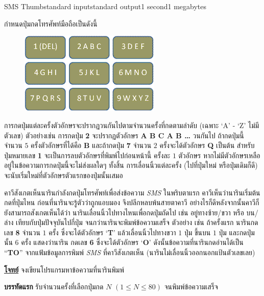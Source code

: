 \documentclass[11pt,a4paper]{article}
\begin{document}
\begin{problem}{SMS Thumb}{standard input}{standard output}{1 second}{1 megabytes}

กำหนดปุ่มกดโทรศัพท์มือถือเป็นดังนี้

\begin{figure}[h!]
\centering
\includegraphics[width=0.6\textwidth]{../latex/img/1059/1059-1.png}
\end{figure}

การกดปุ่มแต่ละครั้งตัวอักษรจะปรากฏวนกันไปตามจำนวนครั้งที่กดตามลำดับ (เฉพาะ ‘A’ - ‘Z’ ไม่มีตัวเลข) ตัวอย่างเช่น การกดปุ่ม \textbf{2} จะปรากฏตัวอักษร \textbf{A B C A B …} วนกันไป ถ้ากดปุ่มนี้จำนวน $5$ ครั้งตัวอักษรที่ได้คือ \textbf{B} และถ้ากดปุ่ม \textbf{7} จำนวน $2$ ครั้งจะได้ตัวอักษร \textbf{Q} เป็นต้น สำหรับปุ่มหมายเลข \textbf{1} จะเป็นการลบตัวอักษรที่พิมพ์ไปก่อนหน้านี้ ครั้งละ $1$ ตัวอักษร หากไม่มีตัวอักษรเหลืออยู่ในข้อความการกดปุ่มนี้จะไม่ส่งผลใดๆ ทั้งสิ้น การเลื่อนนิ้วแต่ละครั้ง (ไปที่ปุ่มใหม่ หรือปุ่มเดิมก็ดี) จะนับเริ่มใหม่ที่ตัวอักษรตัวแรกของปุ่มนั้นเสมอ

 

คาวีสังเกตเห็นนารินกำลังกดปุ่มโทรศัพท์เพื่อส่งข้อความ \textit{SMS} ในพริบตาแรก คาวีเห็นว่านารินเริ่มต้นกดที่ปุ่มไหน ก่อนที่นารินจะรู้ตัวว่าถูกแอบมอง จึงปลีกหลบพ้นสายตาคาวี อย่างไรก็ดีหลังจากนั้นคาวีก็ยังสามารถสังเกตเห็นได้ว่า นารินเลื่อนนิ้วไปทางไหนเพื่อกดปุ่มถัดไป เช่น อยู่ทางซ้าย/ขวา หรือ บน/ล่าง เทียบกับปุ่มปัจจุบันไปกี่ปุ่ม จนกว่านารินจะพิมพ์ข้อความเสร็จ ตัวอย่าง เช่น ถ้าครั้งแรก นารินกดเลข \textbf{8} จำนวน $1$ ครั้ง ซึ่งจะได้ตัวอักษร ‘\textbf{T}’ แล้วเลื่อนนิ้วไปทางขวา $1$ ปุ่ม ขึ้นบน $1$ ปุ่ม และกดปุ่มนั้น $6$ ครั้ง แสดงว่านาริน กดเลข \textbf{6} ซึ่งจะได้ตัวอักษร ‘\textbf{O}’ ดังนั้นข้อความที่นารินกดอ่านได้เป็น “\textbf{TO}” จากแฟ้มข้อมูลการพิมพ์ \textit{SMS} ที่คาวีสังเกตเห็น (นารินไม่เลื่อนนิ้วออกนอกแป้นตัวเลขเลย)

\bigskip
\underline{\textbf{โจทย์}}  จงเขียนโปรแกรมหาข้อความที่นารินพิมพ์

\InputFile

\textbf{บรรทัดแรก} รับจำนวนครั้งที่เลือกปุ่มกด $N$ $(1 \leq N \leq 80)$ จนพิมพ์ข้อความเสร็จ


\end{problem}
\end{document}
